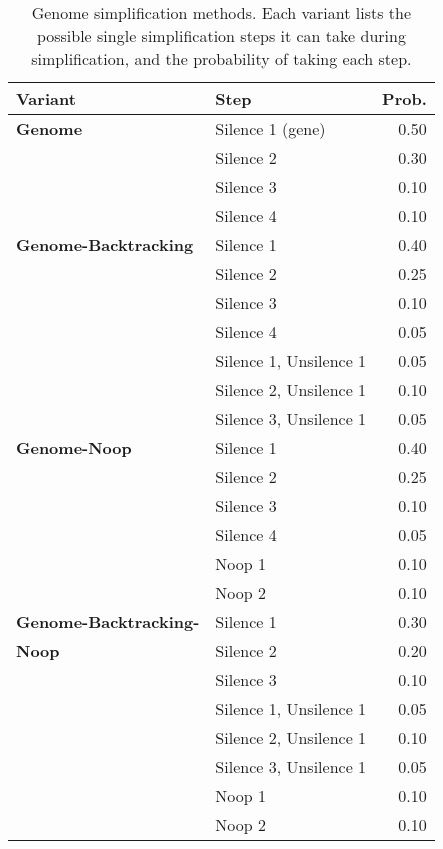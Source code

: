 \begin{table}[t]
	\centering
	\caption{Genome simplification methods. Each variant lists the possible single simplification steps it can take during simplification, and the probability of taking each step.}
	\label{table:genome-methods}
	\begin{tabu} to \textwidth {l l r}
		\toprule
		\textbf{Variant} & \textbf{Step} & \textbf{Prob.}  \\
		\midrule
		\textbf{Genome} & Silence 1 (gene) & 0.50 \\
		       & Silence 2 & 0.30 \\
		       & Silence 3 & 0.10 \\
		       & Silence 4 & 0.10 \\
		\midrule
		\textbf{Genome-Backtracking}
		       & Silence 1 & 0.40 \\
		       & Silence 2 & 0.25 \\
		       & Silence 3 & 0.10 \\
		       & Silence 4 & 0.05 \\
		       & Silence 1, Unsilence 1 & 0.05 \\
		       & Silence 2, Unsilence 1 & 0.10 \\
		       & Silence 3, Unsilence 1 & 0.05 \\
		\midrule
		\textbf{Genome-Noop}
		       & Silence 1 & 0.40 \\
		       & Silence 2 & 0.25 \\
		       & Silence 3 & 0.10 \\
		       & Silence 4 & 0.05 \\
		       & Noop 1 & 0.10 \\
		       & Noop 2 & 0.10 \\
		\midrule
		\textbf{Genome-Backtracking-}
		       & Silence 1 & 0.30 \\
		  \textbf{Noop} & Silence 2 & 0.20 \\
		       & Silence 3 & 0.10 \\
		       & Silence 1, Unsilence 1 & 0.05 \\
		       & Silence 2, Unsilence 1 & 0.10 \\
		       & Silence 3, Unsilence 1 & 0.05 \\
		       & Noop 1 & 0.10 \\
		       & Noop 2 & 0.10 \\
		\bottomrule
	\end{tabu}
\end{table}

